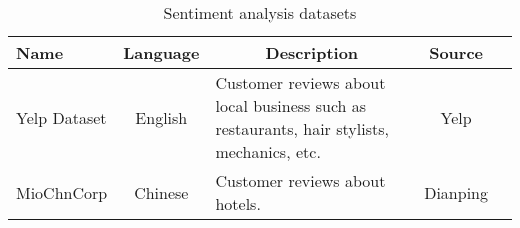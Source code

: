 \begin{table}[]
\centering
\caption{Sentiment analysis datasets}
\label{tab:sa_data}
\begin{tabular}{|l|c|m{}|c|c|}
\hline
Name      & Language & \multicolumn{1}{c|}{Description}
              & \multicolumn{1}{c|}{Source} \\ \hline
Yelp Dataset\cite{Yelp9} & English           & Customer reviews about local business such as restaurants, hair stylists, mechanics, etc.
                                  & Yelp \\ \hline
MioChnCorp\cite{MioChnCorp}   & Chinese           & Customer reviews about hotels.
                          & Dianping \\ \hline
\end{tabular}
\end{table}
